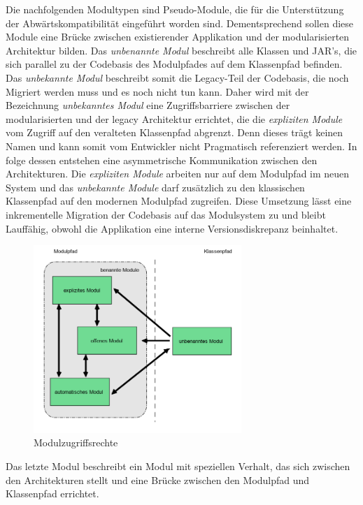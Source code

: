     \newline Die nachfolgenden Modultypen sind Pseudo-Module, die für die Unterstützung der Abwärtskompatibilität eingeführt worden sind. 
    Dementsprechend sollen diese Module eine Brücke zwischen existierender Applikation und der modularisierten Architektur bilden. 
    \newline Das \textit{unbenannte Modul} beschreibt alle Klassen und JAR's, die sich parallel zu der Codebasis des Modulpfades auf dem Klassenpfad befinden. 
    Das \textit{unbekannte Modul} beschreibt somit die Legacy-Teil der Codebasis, die noch Migriert werden muss und es noch nicht tun kann.
    Daher wird mit der Bezeichnung \textit{unbekanntes Modul} eine Zugriffsbarriere zwischen der modularisierten und der legacy Architektur errichtet, die die \textit{expliziten Module} vom Zugriff auf den veralteten Klassenpfad abgrenzt. 
    Denn dieses trägt keinen Namen und kann somit vom Entwickler nicht Pragmatisch referenziert werden. 
    \newline In folge dessen entstehen eine asymmetrische Kommunikation zwischen den Architekturen. 
    Die \textit{expliziten Module} arbeiten nur auf dem Modulpfad im neuen System und das \textit{unbekannte Module} darf zusätzlich zu den klassischen Klassenpfad auf den modernen Modulpfad zugreifen. 
    Diese Umsetzung lässt eine inkrementelle Migration der Codebasis auf das Modulsystem zu und bleibt Lauffähig, obwohl die Applikation eine interne Versionsdiskrepanz beinhaltet.
    \begin{figure}[h]
      \centering
      \includegraphics[width=0.7\textwidth]{material/images/module-access.png}
      \caption{Modulzugriffsrechte}
      \label{fig:kopplung}
    \end{figure}
    \newline Das letzte Modul beschreibt ein Modul mit speziellen Verhalt, das sich zwischen den Architekturen stellt und eine Brücke zwischen den Modulpfad und Klassenpfad errichtet.
